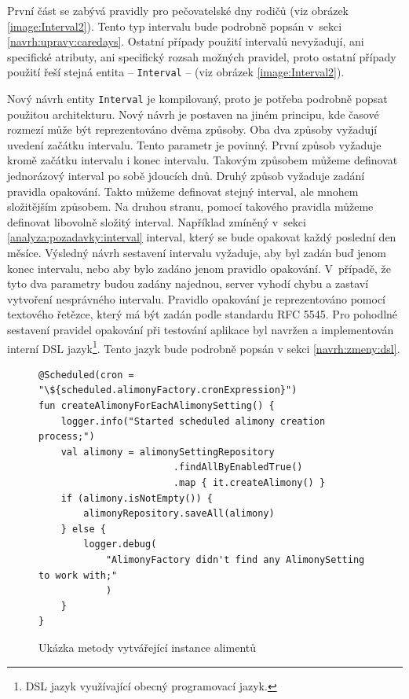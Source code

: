         První část se zabývá pravidly pro pečovatelské dny rodičů (viz obrázek \ref{image:Interval2}). Tento typ intervalu bude podrobně popsán v~sekci \ref{navrh:upravy:caredays}. Ostatní případy použití intervalů nevyžadují, ani specifické atributy, ani specifický rozsah možných pravidel, proto ostatní případy použití řeší stejná entita -- \verb|Interval| -- (viz obrázek \ref{image:Interval2}).
    
        Nový návrh entity \verb|Interval| je kompilovaný, proto je potřeba podrobně popsat použitou architekturu. Nový návrh je postaven na jiném principu, kde časové rozmezí může být reprezentováno dvěma způsoby. Oba dva způsoby vyžadují uvedení začátku intervalu. Tento parametr je povinný. První způsob vyžaduje kromě začátku intervalu i konec intervalu. Takovým způsobem můžeme definovat jednorázový interval po sobě jdoucích dnů. Druhý způsob vyžaduje zadání pravidla opakování. Takto můžeme definovat stejný interval, ale mnohem složitějším způsobem. Na druhou stranu, pomocí takového pravidla můžeme definovat libovolně složitý interval. 
        Například zmíněný v~sekci \ref{analyza:pozadavky:interval} interval, který se bude opakovat každý poslední den měsíce. Výsledný návrh sestavení intervalu vyžaduje, aby byl zadán buď jenom konec intervalu, nebo aby bylo zadáno jenom pravidlo opakování. V~případě, že tyto dva parametry budou zadány najednou, server vyhodí chybu a zastaví vytvoření nesprávného intervalu. Pravidlo opakování je reprezentováno pomocí textového řetězce, který má být zadán podle standardu {RFC 5545}.\cite{recurrence-rule} Pro pohodlné sestavení pravidel opakování při testování aplikace byl navržen a implementován {interní DSL jazyk}\footnote{DSL jazyk využívající obecný programovací jazyk.}. Tento jazyk bude podrobně popsán v sekci \ref{navrh:zmeny:dsl}.
        \begin{figure}[h]
                \begin{verbatim}
@Scheduled(cron = "\${scheduled.alimonyFactory.cronExpression}")
fun createAlimonyForEachAlimonySetting() {
    logger.info("Started scheduled alimony creation process;")
    val alimony = alimonySettingRepository
                        .findAllByEnabledTrue()
                        .map { it.createAlimony() }
    if (alimony.isNotEmpty()) {
        alimonyRepository.saveAll(alimony)
    } else {
        logger.debug(
            "AlimonyFactory didn't find any AlimonySetting to work with;"
            )
    }
}
                \end{verbatim}
                \caption{Ukázka metody vytvářející instance alimentů} 
                \label{code:create-alimony}
            \end{figure}
        
